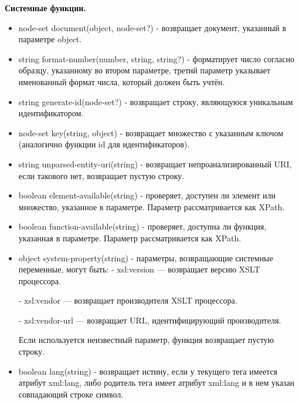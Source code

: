 \documentclass[12pt,a4paper,oneside]{article} %
\begin{document}
\textbf{Системные функции.}

\begin{itemize}
\item node-set document(object, node-set?) - возвращает документ,  \linebreak
указанный в параметре object.
\item string format-number(number, string, string?) - форматирует  \linebreak
число согласно образцу, указанному во втором параметре, третий  \linebreak
параметр указывает именованный формат числа, который должен быть учтён.
\item string generate-id(node-set?) - возвращает строку, являющуюся  \linebreak
уникальным идентификатором.
\item node-set key(string, object) - возвращает множество с указанным ключом (аналогично функции id для идентификаторов).
\item string unparsed-entity-uri(string) - возвращает непроанализированный URI,  \linebreak
если такового нет, возвращает пустую строку.
\item boolean element-available(string) - проверяет, доступен ли элемент или  \linebreak
    множество, указанное в параметре. Параметр рассматривается как XPath.
\item boolean function-available(string) - проверяет, доступна ли функция,  \linebreak
указанная в параметре. Параметр рассматривается как XPath.
\item object system-property(string) - параметры, возвращающие системные  \linebreak
переменные, могут быть:
- xsl:version — возвращает версию XSLT процессора.

- xsl:vendor — возвращает производителя XSLT процессора.

- xsl:vendor-url — возвращает URL, идентифицирующий производителя.

Если используется неизвестный параметр, функция возвращает пустую строку.

\item boolean lang(string) - возвращает истину, если у текущего тега имеется  \linebreak
атрибут xml:lang, либо родитель тега имеет атрибут xml:lang и в нем  \linebreak
указан совпадающий строке символ.
\end{itemize}
\end{document}

